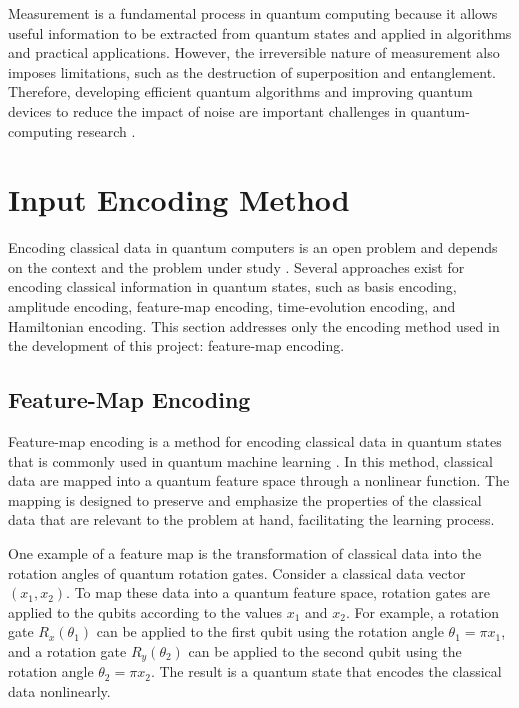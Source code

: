 Measurement is a fundamental process in quantum computing because it allows useful information to be extracted from quantum states and applied in algorithms and practical applications. However, the irreversible nature of measurement also imposes limitations, such as the destruction of superposition and entanglement. Therefore, developing efficient quantum algorithms and improving quantum devices to reduce the impact of noise are important challenges in quantum-computing research \cite{Schuld2021MLQComputers}.

\section{Input Encoding Method} \label{Encoding}

Encoding classical data in quantum computers is an open problem and depends on the context and the problem under study \cite{Schuld2021MLQComputers}. Several approaches exist for encoding classical information in quantum states, such as basis encoding, amplitude encoding, feature-map encoding, time-evolution encoding, and Hamiltonian encoding. This section addresses only the encoding method used in the development of this project: feature-map encoding.

\subsection{Feature-Map Encoding}

Feature-map encoding is a method for encoding classical data in quantum states that is commonly used in quantum machine learning \cite{Havlicek2019qSupervisedLearning}. In this method, classical data are mapped into a quantum feature space through a nonlinear function. The mapping is designed to preserve and emphasize the properties of the classical data that are relevant to the problem at hand, facilitating the learning process.

One example of a feature map is the transformation of classical data into the rotation angles of quantum rotation gates. Consider a classical data vector $(x_1, x_2)$. To map these data into a quantum feature space, rotation gates are applied to the qubits according to the values $x_1$ and $x_2$. For example, a rotation gate $R_x(\theta_1)$ can be applied to the first qubit using the rotation angle $\theta_1 = \pi x_1$, and a rotation gate $R_y(\theta_2)$ can be applied to the second qubit using the rotation angle $\theta_2 = \pi x_2$. The result is a quantum state that encodes the classical data nonlinearly.

